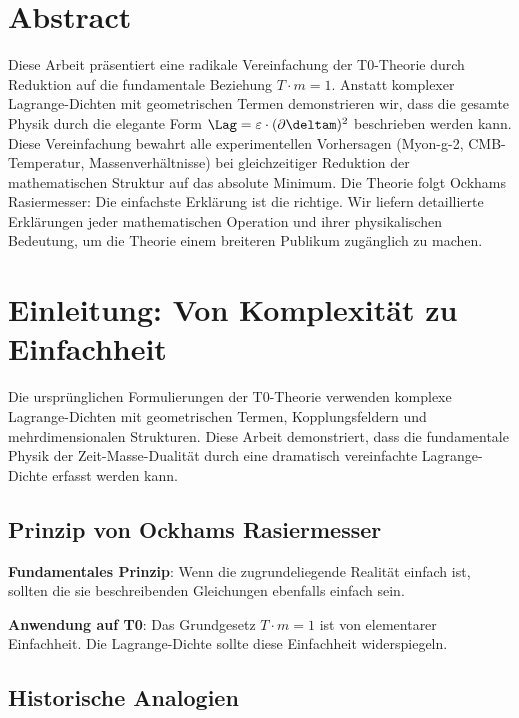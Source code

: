 \hfuzz=200pt
\allowdisplaybreaks

\section*{Abstract}
		Diese Arbeit präsentiert eine radikale Vereinfachung der T0-Theorie durch Reduktion auf die fundamentale Beziehung $T \cdot m = 1$. Anstatt komplexer Lagrange-Dichten mit geometrischen Termen demonstrieren wir, dass die gesamte Physik durch die elegante Form $\Lag = \varepsilon \cdot (\partial \deltam)^2$ beschrieben werden kann. Diese Vereinfachung bewahrt alle experimentellen Vorhersagen (Myon-g-2, CMB-Temperatur, Massenverhältnisse) bei gleichzeitiger Reduktion der mathematischen Struktur auf das absolute Minimum. Die Theorie folgt Ockhams Rasiermesser: Die einfachste Erklärung ist die richtige. Wir liefern detaillierte Erklärungen jeder mathematischen Operation und ihrer physikalischen Bedeutung, um die Theorie einem breiteren Publikum zugänglich zu machen.

	

	\section{Einleitung: Von Komplexität zu Einfachheit}
	
	Die ursprünglichen Formulierungen der T0-Theorie verwenden komplexe Lagrange-Dichten mit geometrischen Termen, Kopplungsfeldern und mehrdimensionalen Strukturen. Diese Arbeit demonstriert, dass die fundamentale Physik der Zeit-Masse-Dualität durch eine dramatisch vereinfachte Lagrange-Dichte erfasst werden kann.
	
	\subsection{Prinzip von Ockhams Rasiermesser}
	
	\begin{tcolorbox}[colback=blue!5!white,colframe=blue!75!black,title=Ockhams Rasiermesser in der Physik]
		\textbf{Fundamentales Prinzip}: Wenn die zugrundeliegende Realität einfach ist, sollten die sie beschreibenden Gleichungen ebenfalls einfach sein.
		
		\textbf{Anwendung auf T0}: Das Grundgesetz $T \cdot m = 1$ ist von elementarer Einfachheit. Die Lagrange-Dichte sollte diese Einfachheit widerspiegeln.
	\end{tcolorbox}
	
	\subsection{Historische Analogien}
	
